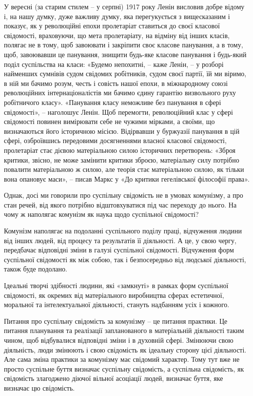 \documentclass[12pt,a4paper,openany]{book}
\begin{document}
У вересні (за старим стилем – у серпні) 1917 року Ленін висловив добре відому і, на нашу думку, дуже важливу думку, яка перегукується з вищесказаним і показує, як у революційні епохи пролетаріат ставиться до своєї класової свідомості, враховуючи, що мета пролетаріату, на відміну від інших класів, полягає не в тому, щоб завоювати і закріпити своє класове панування, а в тому, щоб, завоювавши це панування, знищити будь-яке класове панування і будь-який поділ суспільства на класи: «Будемо непохитні, – каже Ленін, – у розборі найменших сумнівів судом свідомих робітників, судом своєї партії, їй ми віримо, в ній ми бачимо розум, честь і совість нашої епохи, в міжнародному союзі революційних інтернаціоналістів ми бачимо єдину гарантію визвольного руху робітничого класу». «Панування класу неможливе без панування в сфері свідомості», – наголошує Ленін. Щоб перемогти, революційний клас у сфері свідомості повинен вимірювати себе не чужими мірками, а своїми, що визначаються його історичною місією. Відірвавши у буржуазії панування в цій сфері, озброївшись передовими досягненнями власної класової свідомості, пролетаріат стає дієвою матеріальною силою історичних перетворень: «Зброя критики, звісно, не може замінити критики зброєю, матеріальну силу потрібно повалити матеріальною ж силою, але теорія стає матеріальною силою, як тільки вона опановує маси», – писав Маркс у «До критики гегелівської філософії права».

Однак, досі ми говорили про суспільну свідомість не в умовах комунізму, а про стан речей, від якого потрібно відштовхуватися під час переходу до нього. На чому ж наполягає комунізм як наука щодо суспільної свідомості?

Комунізм наполягає на подоланні суспільного поділу праці, відчуження людини від інших людей, від процесу та результатів її діяльності. А це, у свою чергу, передбачає відповідні зміни в галузі суспільної свідомості. Відчуження форм суспільної свідомості як між собою, так і безпосередньо від людської діяльності, також буде подолано.

Ідеальні творчі здібності людини, які «замкнуті» в рамках форм суспільної свідомості, як окремих від матеріального виробництва сферах естетичної, моральної та інтелектуальної діяльності, стануть надбанням усіх і кожного.

Питання про суспільну свідомість за комунізму – це питання практики. Це питання планування та реалізації запланованого в матеріальній діяльності таким чином, щоб відбувалися відповідні зміни і в духовній сфері. Змінюючи свою діяльність, люди змінюють і свою свідомість як ідеальну сторону цієї діяльності. Але сама зміна практики за комунізму має свідомий характер. Тому тут вже не просто суспільне буття визначає суспільну свідомість, а суспільна свідомість, як свідомість злагоджено діючої вільної асоціації людей, визначає буття, яке визначає цю свідомість.
\end{document}

